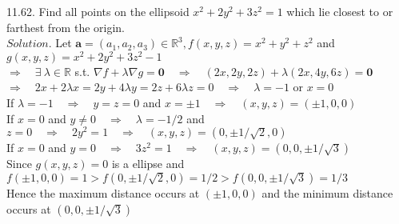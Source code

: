 \documentclass[12pt]{book}
\begin{document}
\begin{CJK}{UTF8}{bsmi}
\clearpage

11.62. Find all points on the ellipsoid $x^2+2y^2+3z^2=1$ which lie closest to or farthest from the origin. \\
$Solution$. Let $\mathbf{a}=(a_1, a_2, a_3)\in\mathbb{R}^3, f(x, y, z)=x^2+y^2+z^2$ and $g(x, y, z)=x^2+2y^2+3z^2-1$ \\
$\Rightarrow\quad\exists\ \lambda\in\mathbb{R}$ s.t. $\nabla f+\lambda\nabla g=\mathbf{0}\quad\Rightarrow\quad(2x, 2y, 2z)+\lambda(2x, 4y, 6z)=\mathbf{0}$ \\
$\Rightarrow\quad2x+2\lambda x=2y+4\lambda y=2z+6\lambda z=0\quad\Rightarrow\quad\lambda=-1$ or $x=0$ \\
If $\lambda=-1\quad\Rightarrow\quad y=z=0$ and $x=\pm1\quad\Rightarrow\quad(x, y, z)=(\pm1, 0, 0)$ \\
If $x=0$ and $y\ne0\quad\Rightarrow\quad\lambda=-1/2$ and $z=0\quad\Rightarrow\quad2y^2=1\quad\Rightarrow\quad(x, y, z)=(0, \pm1/\sqrt{2}, 0)$ \\
If $x=0$ and $y=0\quad\Rightarrow\quad3z^2=1\quad\Rightarrow\quad(x, y, z)=(0, 0, \pm1/\sqrt{3})$ \\
Since $g(x, y, z)=0$ is a ellipse and $f(\pm1, 0, 0)=1>f(0, \pm1/\sqrt{2}, 0)=1/2>f(0, 0, \pm1/\sqrt{3})=1/3$ \\
Hence the maximum distance occurs at $(\pm1, 0, 0)$ and the minimum distance occurs at $(0, 0, \pm1/\sqrt{3})$ \\


\end{CJK}
\end{document}
